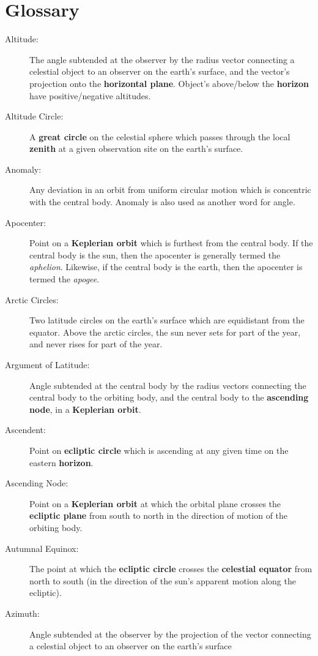\chapter{Glossary}
{\small 
\begin{description}
\item[Altitude:] The angle subtended at the observer by the radius vector connecting a
celestial object to an observer on the earth's surface, and the vector's projection onto the {\bf horizontal plane}. Object's above/below the {\bf horizon}\/ have positive/negative altitudes.
\item[Altitude Circle:] A {\bf great circle}\/ on the celestial sphere which passes through the local {\bf zenith}\/
at a given observation site on the earth's surface.
\item [Anomaly:] Any deviation in an orbit from uniform
circular motion which is concentric with the central body. Anomaly
is also used as another word for angle.
\item [Apocenter:] Point on a {\bf Keplerian orbit}\/ which is furthest from the
central body. If the central body is the sun, then the apocenter is
generally termed the {\em aphelion}. Likewise, if the central body is the
earth, then the apocenter is termed the {\em apogee}.
\item [Arctic Circles:] Two latitude circles on
the earth's surface which are equidistant from the equator. Above the
arctic circles, the sun never sets for part of the year, and never rises
for part of the year.
\item[Argument of Latitude:] Angle subtended at the central body by the radius
vectors connecting the central body to the orbiting body, and the
central body to the {\bf ascending node}, in a {\bf Keplerian
orbit}. 
\item [Ascendent:] Point on {\bf ecliptic circle}\/ which is ascending at any given time on the eastern {\bf horizon}.
\item[Ascending Node:] Point on a {\bf Keplerian orbit}\/ at which the
orbital plane crosses the {\bf ecliptic plane}\/ from south to north
in the direction of motion of the orbiting body.
\item [Autumnal Equinox:] The point at which the 
{\bf ecliptic  circle}\/ crosses the {\bf celestial
equator}\/ from north to south (in the direction of the sun's apparent motion
along the ecliptic).
\item [Azimuth:] Angle subtended at the observer by the projection
of the vector connecting a celestial object to an observer on the  earth's surface

\end{description}}
